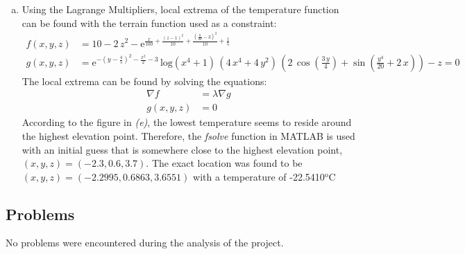 \documentclass[12pt,onecolumn]{article}
\begin{document}
\begin{enumerate}[a.]
\item Using the Lagrange Multipliers, local extrema of the temperature function can be found with the terrain function used as a constraint:
\begin{align*}
	f(x,y,z)&=10 - 2\, z^2 - \mathrm{e}^{\frac{x}{100} + \frac{{\left(z - 1\right)}^2}{10} + \frac{{\left(\frac{y}{20} - 3\right)}^2}{10} + \frac{1}{5}}\\
	g(x,y,z)&=\mathrm{e}^{ - {\left(y - \frac{4}{5}\right)}^2 - \frac{x^2}{2} - 3}\, \mathrm{log}\!\left(x^4 + 1\right)\, \left(4\, x^4 + 4\, y^2\right)\, \left(2\, \cos\!\left(\frac{3\, y}{4}\right) + \sin\!\left(\frac{y^4}{20} + 2\, x\right)\right)-z = 0
\end{align*}
The local extrema can be found by solving the equations:
\begin{align*}
	\nabla f &= \lambda \nabla g\\
	g(x,y,z) &= 0
\end{align*}
According to the figure in \textit{(e)}, the lowest temperature seems to reside around the highest elevation point. Therefore, the \textit{fsolve} function in MATLAB is used with an initial guess that is somewhere close to the highest elevation point, $(x,y,z)=(-2.3, 0.6, 3.7)$. The exact location was found to be $(x,y,z)=(-2.2995, 0.6863, 3.6551)$ with a temperature of -22.5410$^{\text{o}}$C
\end{enumerate}

\subsection{Problems}

No problems were encountered during the analysis of the project. 

\newpage
\end{document}
